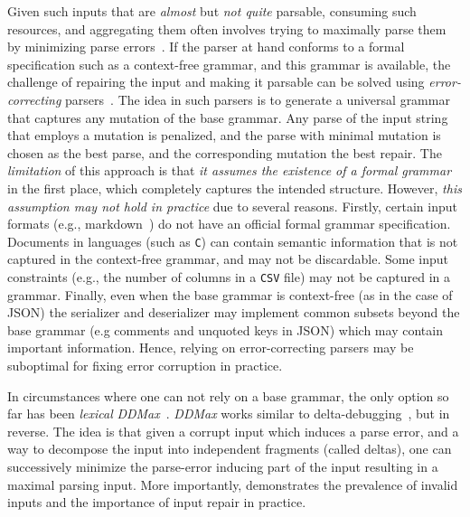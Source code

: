\documentclass[sigconf,review,anonymous]{acmart}
\def\<#1>{\texttt{#1}}
\newcounter{todocounter}
\newcommand{\todo}[1]{\marginpar{$|$}\textcolor{red}{\stepcounter{todocounter}\footnote[\thetodocounter]{\textcolor{red}{\textbf{TODO }}\textit{#1}}}}
\newcommand{\recheck}[1]{\textcolor{red}{#1}}
\renewcommand{\todo}[1]{}
\newcommand{\ddmax}{\textit{DDMax}\xspace}
\begin{document}
Given such inputs that are \emph{almost} but \emph{not quite} parsable,
consuming such resources, and aggregating them often involves trying to
maximally parse them by minimizing parse errors~\cite{kirschner2020debugging}.
If the parser at hand conforms to a formal specification such as a context-free
grammar, and this grammar is available,
the challenge of repairing the input and making it parsable can be solved using
\emph{error-correcting} parsers~\cite{aho1972minimum,diekmann2020dont,parr2011ll}.
The idea in such parsers is to generate a universal grammar that captures
any mutation of the base grammar. Any parse of the input string that employs a
mutation is penalized, and the parse with minimal mutation is chosen as the
best parse, and the corresponding mutation the best repair. The \textit{limitation} of
this approach is that\textit{ it assumes the existence of a formal grammar} in the first
place, which completely captures the intended structure.
However, %
\textit{this assumption may not hold in practice} due to several reasons.
Firstly, %
certain input formats (e.g., markdown~\cite{gruber2004markdown}) do not have
an official formal grammar specification.
Documents in languages (such as \<C>) can contain semantic
information that is not captured in the context-free grammar, and may not be
discardable. Some input constraints (e.g., the number of columns in a \<CSV> file) may
not be captured in a grammar. Finally, even when the base grammar is context-free
(as in the case of JSON) the serializer and deserializer may implement common
subsets beyond the base grammar (e.g comments and unquoted keys in JSON) which may
contain important information. Hence, relying on error-correcting parsers may
be suboptimal for fixing error corruption in practice.

In circumstances where one can not rely on a base grammar, the only option so far
has been \textit{lexical} \ddmax~\cite{kirschner2020debugging}. \ddmax works similar to
delta-debugging~\cite{zeller2002simplifying}, but in reverse. The idea
is that given a corrupt input which induces a parse error, and a way to
decompose the input into independent fragments (called deltas), one can
successively minimize the parse-error inducing part of the input resulting in a
maximal parsing input.
More importantly, \citet{kirschner2020debugging} demonstrates the prevalence of invalid inputs and the importance of input repair in practice. %
\end{document}

